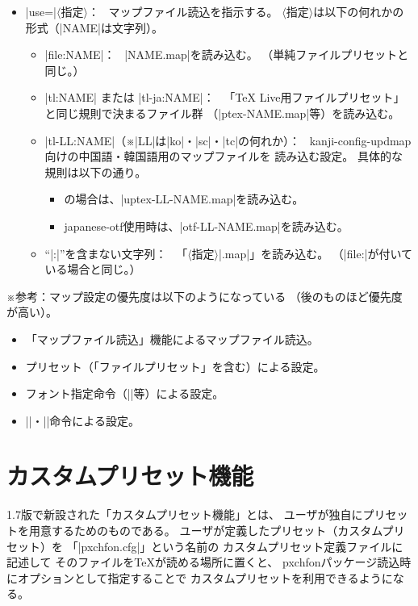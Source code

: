 \documentclass[uplatex,dvipdfmx,a4paper]{jsarticle}
\newcommand{\Pkg}[1]{\textsf{#1}}
\newcommand{\Meta}[1]{$\langle$\mbox{}#1\mbox{}$\rangle$}
\newcommand{\Note}{\par\noindent ※}
\newcommand{\Means}{：\ }
\newcommand{\Zk}{\mbox{}}
\providecommand{\Strong}[1]{\textsf{#1}}
\begin{document}
\begin{itemize}
\item |use=|\Meta{指定}\Means
  マップファイル読込を指示する。
  \Meta{指定}は以下の何れかの形式（|NAME|は文字列）。
  \begin{itemize}
  \item |file:NAME|\Means
    |NAME.map|を読み込む。
    （単純ファイルプリセットと同じ。）
  \item |tl:NAME| または |tl-ja:NAME|\Means
    「{\TeX} Live用ファイルプリセット」と同じ規則で決まるファイル群
    （|ptex-NAME.map|等）を読み込む。
  \item |tl-LL:NAME|（※|LL|は|ko|・|sc|・|tc|の何れか）\Means
    kanji-config-updmap向けの中国語・韓国語用のマップファイルを
    読み込む設定。
    具体的な規則は以下の通り。
    \begin{itemize}
    \item {\upLaTeX}の場合は、|uptex-LL-NAME.map|を読み込む。
    \item \Pkg{japanese-otf}使用時は、|otf-LL-NAME.map|を読み込む。
    \end{itemize}
  \item “|:|”を含まない文字列\Means
    「\Meta{指定}\Zk|.map|」を読み込む。
    （|file:|が付いている場合と同じ。）
  \end{itemize}
\end{itemize}

\Note 参考：マップ設定の優先度は以下のようになっている
（後のものほど優先度が高い）。
\begin{itemize}
\item 「マップファイル読込」機能によるマップファイル読込。
\item プリセット（「ファイルプリセット」を含む）による設定。
\item フォント指定命令（|\setminchofont|等）による設定。
\item |\usefontmapfile|・|\usefontmapline|命令による設定。
\end{itemize}


\section{カスタムプリセット機能}
\label{sec:CustomPreset}

1.7版で新設された「カスタムプリセット機能」とは、
ユーザが独自にプリセットを用意するためのものである。
ユーザが定義したプリセット（\Strong{カスタムプリセット}）を
「|pxchfon.cfg|」という名前の
\Strong{カスタムプリセット定義ファイル}に記述して
そのファイルを{\TeX}が読める場所に置くと、
\Pkg{pxchfon}パッケージ読込時にオプションとして指定することで
カスタムプリセットを利用できるようになる。
\end{document}
